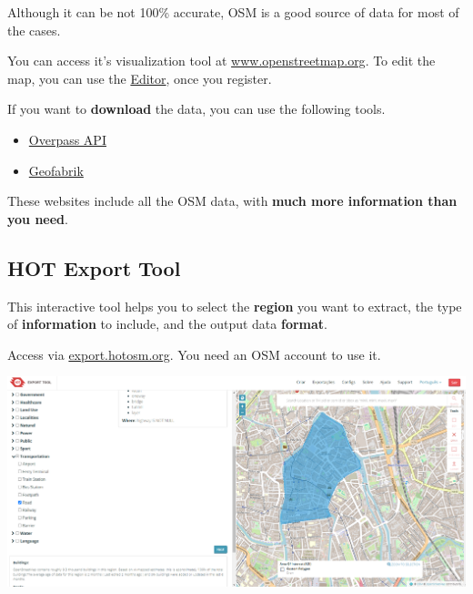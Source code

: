 \documentclass[
  letterpaper,
  DIV=11,
  numbers=noendperiod]{scrreprt}
\providecommand{\tightlist}{%
  \setlength{\itemsep}{0pt}\setlength{\parskip}{0pt}}\usepackage{longtable,booktabs,array}
\begin{document}
\begin{tcolorbox}[enhanced jigsaw, breakable, left=2mm, colframe=quarto-callout-caution-color-frame, leftrule=.75mm, bottomrule=.15mm, arc=.35mm, rightrule=.15mm, colback=white, opacityback=0, toprule=.15mm]
\begin{minipage}[t]{5.5mm}
\textcolor{quarto-callout-caution-color}{\faFire}
\end{minipage}%
\begin{minipage}[t]{\textwidth - 5.5mm}

Although it can be not 100\% accurate, OSM is a good source of data for
most of the cases.

\end{minipage}%
\end{tcolorbox}

You can access it's visualization tool at
\href{https://www.openstreetmap.org/}{www.openstreetmap.org}. To edit
the map, you can use the
\href{https://www.openstreetmap.org/edit}{Editor}, once you register.

If you want to \textbf{download} the data, you can use the following
tools.

\begin{itemize}
\tightlist
\item
  \href{https://wiki.openstreetmap.org/wiki/Overpass_API}{Overpass API}
\item
  \href{https://download.geofabrik.de/}{Geofabrik}
\end{itemize}

These websites include all the OSM data, with \textbf{much more
information than you need}.

\subsection{HOT Export Tool}\label{hot-export-tool}

This interactive tool helps you to select the \textbf{region} you want
to extract, the type of \textbf{information} to include, and the output
data \textbf{format}.

Access via \href{https://export.hotosm.org/}{export.hotosm.org}. You
need an OSM account to use it.

\includegraphics{images/clipboard-1441436716.png}
\end{document}
